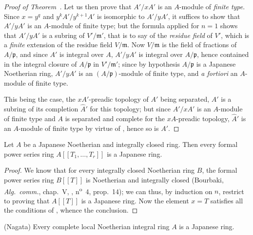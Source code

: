 \begin{proof}[Proof of Theorem~{\rm{}}]
Let us then prove that $A'/xA'$ is an $A$-module of \emph{finite type}.
Since $x=y^q$ and $y^kA'/y^{k+1}A'$ is isomorphic to $A'/yA'$, it suffices to show that $A'/yA'$ is an $A$-module of finite type; but the formula  applied for $n=1$ shows that $A'/yA'$ is a subring of $V'/\mathfrak{m}'$, that is to say of the \emph{residue field} of $V'$, which is a \emph{finite} extension of the residue field $V/\mathfrak{m}$.
Now $V/\mathfrak{m}$ is the field of fractions of $A/\mathfrak{p}$, and since $A'$ is integral over $A$, $A'/yA'$ is integral over $A/\mathfrak{p}$, hence contained in the integral closure of $A/\mathfrak{p}$ in $V'/\mathfrak{m}'$; since by hypothesis $A/\mathfrak{p}$ is a Japanese Noetherian ring, $A'/yA'$ is an $(A/\mathfrak{p})$-module of finite type, and \emph{a fortiori} an $A$-module of finite type.

This being the case, the $xA'$-preadic topology of $A'$ being separated, $A'$ is a subring of its completion $\hat{A}'$ for this topology; but since $A'/xA'$ is an $A$-module of finite type and $A$ is separated and complete for the $xA$-preadic topology, $\hat{A}'$ is an $A$-module of finite type by virtue of , hence so is $A'$.
\end{proof}

\begin{corollary}[23.1.4]
\label{0.23.1.4}
Let $A$ be a Japanese Noetherian and integrally closed ring.
Then every formal power series ring $A[[T_1,\ldots,T_r]]$ is a Japanese ring.
\end{corollary}

\begin{proof}
We know that for every integrally closed Noetherian ring $B$, the formal power series ring $B[[T]]$ is Noetherian and integrally closed (Bourbaki, \emph{Alg.~comm.}, chap.~V, , n\textsuperscript{o}~4, prop.~14); we can thus, by induction on $n$, restrict to proving that $A[[T]]$ is a Japanese ring.
Now the element $x=T$ satisfies all the conditions of , whence the conclusion.
\end{proof}

\begin{theorem}[23.1.5]
\label{0.23.1.5}
\textnormal{(Nagata)}
Every complete local Noetherian integral ring $A$ is a Japanese ring.
\end{theorem}

